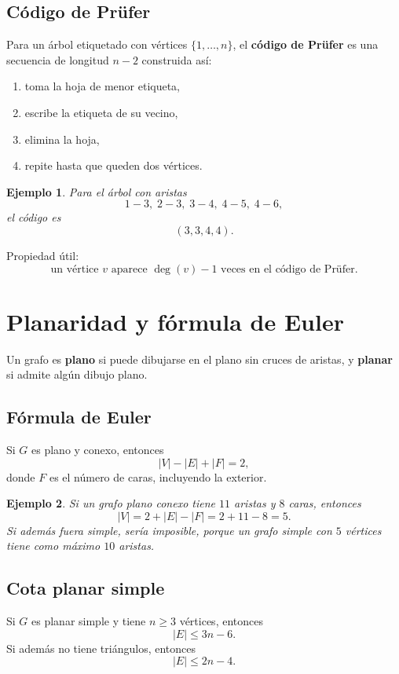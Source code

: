 \documentclass[11pt,a4paper]{article}
\newtheorem*{ej}{Ejemplo}
\begin{document}
\subsection{Código de Prüfer}
Para un árbol etiquetado con vértices $\{1,\dots,n\}$, el \textbf{código de Prüfer} es una secuencia de longitud $n-2$ construida así:
\begin{enumerate}
    \item toma la hoja de menor etiqueta,
    \item escribe la etiqueta de su vecino,
    \item elimina la hoja,
    \item repite hasta que queden dos vértices.
\end{enumerate}

\begin{ej}
Para el árbol con aristas
\[
1-3,\;2-3,\;3-4,\;4-5,\;4-6,
\]
el código es
\[
(3,3,4,4).
\]
\end{ej}

Propiedad útil:
\[
\text{un vértice } v \text{ aparece } \deg(v)-1 \text{ veces en el código de Prüfer.}
\]

\section{Planaridad y fórmula de Euler}

Un grafo es \textbf{plano} si puede dibujarse en el plano sin cruces de aristas, y \textbf{planar} si admite algún dibujo plano.

\subsection{Fórmula de Euler}
Si $G$ es plano y conexo, entonces
\[
|V|-|E|+|F|=2,
\]
donde $F$ es el número de caras, incluyendo la exterior.

\begin{ej}
Si un grafo plano conexo tiene $11$ aristas y $8$ caras, entonces
\[
|V|=2+|E|-|F|=2+11-8=5.
\]
Si además fuera simple, sería imposible, porque un grafo simple con $5$ vértices tiene como máximo $10$ aristas.
\end{ej}

\subsection{Cota planar simple}
Si $G$ es planar simple y tiene $n\ge 3$ vértices, entonces
\[
|E|\le 3n-6.
\]
Si además no tiene triángulos, entonces
\[
|E|\le 2n-4.
\]
\end{document}
